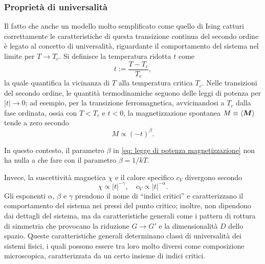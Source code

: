 \subsubsection{Proprietà di universalità}
Il fatto che anche un modello molto semplificato come quello di Ising catturi correttamente le caratteristiche di questa transizione continua del secondo ordine è legato al concetto di universalità, riguardante il comportamento del sistema nel limite per $T \to T_c$. Si definisce la temperatura ridotta $t$ come
\begin{equation}
    t := \frac{T - T_c}{T_c},
\end{equation}
la quale quantifica la vicinanza di $T$ alla temperatura critica $T_c$. Nelle transizioni del secondo ordine, le quantità termodinamiche seguono delle leggi di potenza per $|t| \to 0$; ad esempio, per la transizione ferromagnetica, avvicinandosi a $T_c$ dalla fase ordinata, ossia con $T < T_c$ e $t < 0$, la magnetizzazione spontanea $M \equiv \langle \bm{M} \rangle$ tende a zero secondo 
\begin{equation}
\label{eq: legge di potenza magnetizzazione}
    M \propto (-t)^\beta.
\end{equation}
\begin{notz}
    In questo contesto, il parametro $\beta$ in \eqref{eq: legge di potenza magnetizzazione} non ha nulla a che fare con il parametro $\beta = 1/kT$.
\end{notz}
Invece, la suscettività magnetica $\chi$ e il calore specifico $c_{V}$ divergono secondo
\begin{equation}
\label{eq: legge di potenza suscettività e calore specifico}
    \chi \propto |t|^{-\gamma},\quad c_V \propto |t|^{-\alpha}.
\end{equation}
Gli esponenti $\alpha$, $\beta$ e $\gamma$ prendono il nome di ``indici critici'' e caratterizzano il comportamento del sistema nei pressi del punto critico; inoltre, non dipendono dai dettagli del sistema, ma da caratteristiche generali come i pattern di rottura di simmetria che provocano la riduzione $G \to G'$ e la dimensionalità $D$ dello spazio. Queste caratteristiche generali determinano classi di universalità dei sistemi fisici, i quali possono essere tra loro molto diversi come composizione microscopica, caratterizzata da un certo insieme di indici critici.

